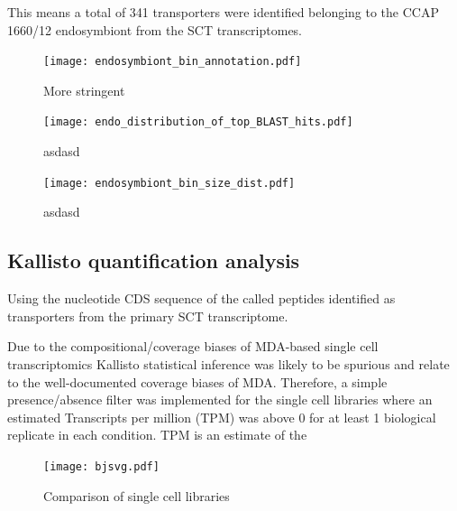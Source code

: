 This means a total of 341 transporters were identified 
belonging to the CCAP 1660/12 endosymbiont from the SCT transcriptomes. 







\begin{figure}
    \texttt{[image: endosymbiont\_bin\_annotation.pdf]}
    \caption{More stringent} 
\end{figure}



\begin{figure}
    \texttt{[image: endo\_distribution\_of\_top\_BLAST\_hits.pdf]}
    \caption[Endostymbiont Bin Top BLAST Hits]{asdasd}
\end{figure}


\begin{figure}
    \texttt{[image: endosymbiont\_bin\_size\_dist.pdf]}
    \caption{asdasd}
\end{figure}






\subsection{Kallisto quantification analysis}

Using the nucleotide CDS sequence of the called peptides identified as transporters
from the primary SCT transcriptome. 

Due to the compositional/coverage biases of MDA-based single cell transcriptomics 
Kallisto statistical inference was likely to be spurious and relate to the 
well-documented coverage biases of MDA. Therefore, a simple presence/absence
filter was implemented for the single cell libraries where an estimated
Transcripts per million (TPM) was above 0 for at least 1 biological replicate
in each condition. 
TPM is an estimate of the 

\begin{figure}
	\texttt{[image: bjsvg.pdf]}
    \caption[Jasper-Shannon Divergence of Single Cell Libararies]{Comparison of single cell libraries}
\label{fig:jsd}
\end{figure}




